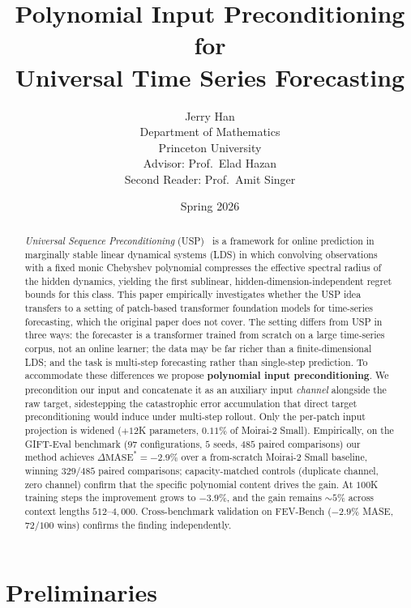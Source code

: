 \documentclass[11pt]{article}
\title{\textbf{Polynomial Input Preconditioning for\\Universal Time Series Forecasting}}
\author{
  Jerry Han \\[0.5em]
  \small Department of Mathematics \\
  \small Princeton University \\[0.5em]
  \small Advisor: Prof.\ Elad Hazan \\
  \small Second Reader: Prof.\ Amit Singer
}
\date{Spring 2026}
\theoremstyle{plain}
\theoremstyle{definition}
\theoremstyle{remark}
\newcommand{\method}{polynomial input preconditioning}
\begin{document}
\maketitle

\begin{abstract}
\noindent
\emph{Universal Sequence Preconditioning} (USP)~\citep{marsden2024universal} is a framework for online prediction in marginally stable linear dynamical systems (LDS) in which convolving observations with a fixed monic Chebyshev polynomial compresses the effective spectral radius of the hidden dynamics, yielding the first sublinear, hidden-dimension-independent regret bounds for this class. This paper empirically investigates whether the USP idea transfers to a setting of patch-based transformer foundation models for time-series forecasting, which the original paper does not cover. The setting differs from USP in three ways: the forecaster is a transformer trained from scratch on a large time-series corpus, not an online learner; the data may be far richer than a finite-dimensional LDS; and the task is multi-step forecasting rather than single-step prediction. To accommodate these differences we propose \textbf{\method{}}. We precondition our input and concatenate it as an auxiliary input \emph{channel} alongside the raw target, sidestepping the catastrophic error accumulation that direct target preconditioning would induce under multi-step rollout. Only the per-patch input projection is widened ($+12$K parameters, $0.11\%$ of Moirai-2 Small). Empirically, on the GIFT-Eval benchmark ($97$ configurations, $5$ seeds, $485$ paired comparisons) our method achieves $\Delta\mathrm{MASE}^* = -2.9\%$ over a from-scratch Moirai-2 Small baseline, winning $329/485$ paired comparisons; capacity-matched controls (duplicate channel, zero channel) confirm that the specific polynomial content drives the gain. At $100$K training steps the improvement grows to $-3.9\%$, and the gain remains $\sim 5\%$ across context lengths $512$--$4{,}000$. Cross-benchmark validation on FEV-Bench ($-2.9\%$ MASE, $72/100$ wins) confirms the finding independently.
\end{abstract}

\tableofcontents
\section{Preliminaries}
\label{sec:preliminaries}
\end{document}
